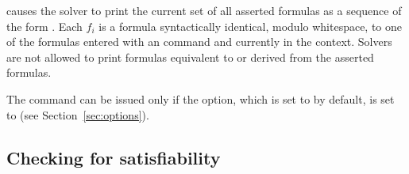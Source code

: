 \begin{description}
\smallskip

%
\item[\expr{(get-assertions)}]
causes the solver to print the current set of all asserted formulas
as a sequence of the form .
Each $f_i$ is a formula syntactically identical, modulo whitespace, 
to one of the formulas entered with an  command and 
currently in the context.
Solvers are not allowed to print formulas equivalent to or derived from 
the asserted formulas.

The command can be issued only if the  option,
which is set to  by default, is set to  
(see Section~\ref{sec:options}).

\end{description}


\subsection{Checking for satisfiability} \label{sec:checking-for-sat}

